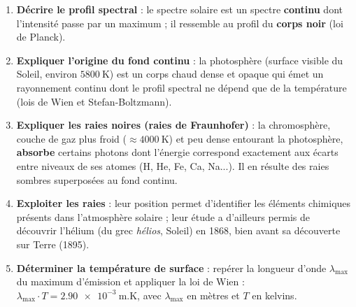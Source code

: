 \documentclass[11pt]{article}
\begin{document}
\begin{methode}
\begin{enumerate}
\item \textbf{Décrire le profil spectral} : le spectre solaire est un spectre \textbf{continu} dont l'intensité passe par un maximum ; il ressemble au profil du \textbf{corps noir} (loi de Planck).
\item \textbf{Expliquer l'origine du fond continu} : la photosphère (surface visible du Soleil, environ $\num{5800}~\text{K}$) est un corps chaud dense et opaque qui émet un rayonnement continu dont le profil spectral ne dépend que de la température (lois de Wien et Stefan-Boltzmann).
\item \textbf{Expliquer les raies noires (raies de Fraunhofer)} : la chromosphère, couche de gaz plus froid ($\approx \num{4000}~\text{K}$) et peu dense entourant la photosphère, \textbf{absorbe} certains photons dont l'énergie correspond exactement aux écarts entre niveaux de ses atomes (H, He, Fe, Ca, Na...). Il en résulte des raies sombres superposées au fond continu.
\item \textbf{Exploiter les raies} : leur position permet d'identifier les éléments chimiques présents dans l'atmosphère solaire ; leur étude a d'ailleurs permis de découvrir l'hélium (du grec \emph{hélios}, Soleil) en 1868, bien avant sa découverte sur Terre (1895).
\item \textbf{Déterminer la température de surface} : repérer la longueur d'onde $\lambda_{\max}$ du maximum d'émission et appliquer la loi de Wien : $\lambda_{\max} \cdot T = \num{2,90e-3}~\text{m.K}$, avec $\lambda_{\max}$ en mètres et $T$ en kelvins.
\end{enumerate}
\end{methode}
\end{document}
